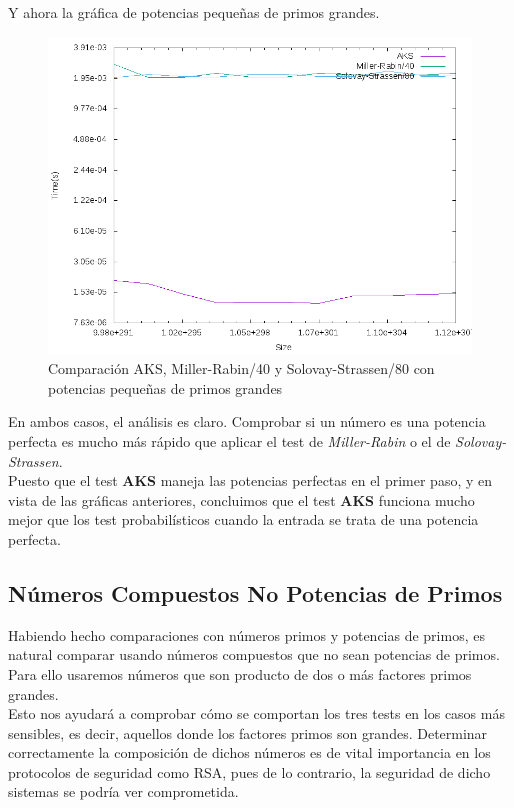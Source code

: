 Y ahora la gráfica de potencias pequeñas de primos grandes.

\begin{figure}[H]
	\centering
	\includegraphics[totalheight=12cm]{img/graphs/aks-probs-powers-5-mean}
	\caption{Comparación AKS, Miller-Rabin/40 y Solovay-Strassen/80 con potencias pequeñas de primos grandes}
\end{figure}

En ambos casos, el análisis es claro. Comprobar si un número es una potencia perfecta es mucho más rápido que aplicar el test de \textit{Miller-Rabin} o el de \textit{Solovay-Strassen}.\\

Puesto que el test \textbf{AKS} maneja las potencias perfectas en el primer paso, y en vista de las gráficas anteriores, concluimos que el test \textbf{AKS} funciona mucho mejor que los test probabilísticos cuando la entrada se trata de una potencia perfecta.

\subsection{Números Compuestos No Potencias de Primos}

Habiendo hecho comparaciones con números primos y potencias de primos, es natural comparar usando números compuestos que no sean potencias de primos. Para ello usaremos números que son producto de dos o más factores primos grandes.\\

Esto nos ayudará a comprobar cómo se comportan los tres tests en los casos más sensibles, es decir, aquellos donde los factores primos son grandes. Determinar correctamente la composición de dichos números es de vital importancia en los protocolos de seguridad como RSA, pues de lo contrario, la seguridad de dicho sistemas se podría ver comprometida.\\

